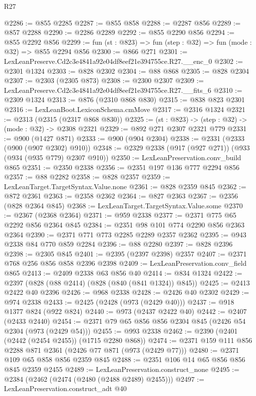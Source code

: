 \begin{lexlean}{R27}
\begin{coremodule}
@2286 := @855 @2285
@2287 := @855 @858
@2288 := @2287 @856
@2289 := @857 @2288
@2290 := @2286 @2289
@2292 := @855 @2290 @856
@2294 := @855 @2292 @856
@2299 := fun (st : @823) => fun (step : @32) => fun (mode : @32) => @855 @2294 @856
@2300 := @866 @271
@2301 := LexLeanPreserve.Cd2c3e4841a92e04df8eef21e394755ce.R27.__enc_0
@2302 := @2301 @1324
@2303 := @828 @2302
@2304 := @88 @868
@2305 := @828 @2304
@2307 := @2303 (@2305 @873)
@2308 := @2300 @2307
@2309 := LexLeanPreserve.Cd2c3e4841a92e04df8eef21e394755ce.R27.__fits_6
@2310 := @2309 @1324
@2313 := @876 (@2310 @868 @830)
@2315 := @838 @823 @2301
@2316 := LexLeanBoot.LexiconSchema.cmMove
@2317 := @2316 @1324
@2321 := @2313 (@2315 (@2317 @868 @830))
@2325 := (st : @823) -> (step : @32) -> (mode : @32) -> @2308 @2321
@2329 := @892 @271 @2307 @2321 @779
@2331 := @900 (@1427 @871)
@2333 := @900 (@904 @2304)
@2338 := @2331 (@2333 (@900 (@907 @2302) @910))
@2348 := @2329 @2338 (@917 (@927 @271)) (@933 (@934 (@935 @779) @2307 @910))
@2350 := LexLeanPreservation.conv_build @865
@2351 := @2350 @2338
@2356 := @2351 @197 @136 @777 @2294 @856
@2357 := @88 @2282
@2358 := @828 @2357
@2359 := LexLeanTarget.TargetSyntax.Value.none
@2361 := @828 @2359 @845
@2362 := @872 @2361
@2363 := @2358 @2362
@2364 := @827 @2363
@2367 := @2356 (@828 @2364 @845)
@2368 := LexLeanTarget.TargetSyntax.Value.some
@2370 := @2367 (@2368 @2364)
@2371 := @959 @2338
@2377 := @2371 @775 @65 @2292 @856 @2364 @845
@2384 := @2351 @98 @101 @774 @2290 @856 @2363 @2364
@2390 := @2371 @771 @773 @2285 @2289 @2357 @2362
@2395 := @943 @2338 @84 @770 @859 @2284
@2396 := @88 @2280
@2397 := @828 @2396
@2398 := @2305 @845
@2401 := @2395 (@2397 @2398) @2357
@2407 := @2371 @768 @256 @856 @858 @2396 @2398
@2409 := LexLeanPreservation.conv_field @865
@2413 := @2409 @2338 @63 @856 @40
@2414 := @834 @1324
@2422 := @2397 (@828 (@88 @2414) (@828 (@840 (@841 @1324)) @845))
@2425 := @2413 @2422 @40 @2396
@2426 := @968 @2338
@2428 := @2426 @40 @2302
@2429 := @974 @2338
@2433 := @2425 (@2428 (@973 (@2429 @40)))
@2437 := @918 @1377 @824 (@922 @824)
@2440 := @973 (@2437 @2422 @40)
@2442 := @2407 (@2433 @2440)
@2454 := @2371 @79 @65 @856 @856 @2304 @845 (@2426 @54 @2304 (@973 (@2429 @54)))
@2455 := @993 @2338
@2462 := @2390 (@2401 (@2442 (@2454 @2455)) (@1715 @2280 @868))
@2474 := @2371 @159 @111 @856 @2288 @871 @2361 (@2426 @77 @871 (@973 (@2429 @77)))
@2480 := @2371 @109 @65 @858 @856 @2359 @845
@2488 := @2351 @106 @14 @65 @856 @856 @845 @2359 @2455
@2489 := LexLeanPreservation.construct_none
@2495 := @2384 (@2462 (@2474 (@2480 (@2488 @2489) @2455)))
@2497 := LexLeanPreservation.construct_adt @40

\end{coremodule}
\end{lexlean}
